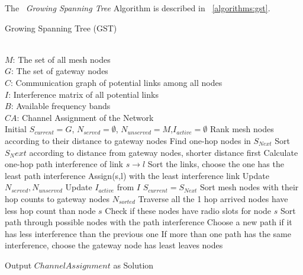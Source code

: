 The ~\emph{Growing Spanning Tree} Algorithm is described in ~\ref{algorithms:gst}.







\begin{algorithm}
    \small
\caption{Growing Spanning Tree (GST)}
\label{algorithms:gst}
\begin{algorithmic}[1]
\REQUIRE  ~~\\
	 $M$: The set of all mesh nodes\\
	 $G$: The set of gateway nodes\\
	 $C$: Communication graph of potential links among all nodes\\
	 $I$: Interference matrix of all potential links \\
	 $B$: Available frequency bands
\ENSURE ~~\\    
$CA$: Channel Assignment of the Network\\
\STATE Initial $S_{current}=G$, $N_{served}=\emptyset$, $N_{unserved}=M$,$I_{active}=\emptyset$
\STATE Rank mesh nodes according to their distance to gateway nodes
	\STATE Find one-hop nodes in $S_{Next}$
	\STATE Sort $S_Next$ according to distance from gateway nodes, shorter distance first
		\STATE Calculate one-hop path interference of link $s\rightarrow l$
		\STATE Sort the links, choose the one has the least path interference
		\STATE Assign(s,l) with the least interference link
		\STATE Update $N_{served},N_{unserved}$
		\STATE Update $I_{active}$ from $I$
	\ENDFOR
	\STATE $S_{current}=S_{Next}$
\ENDFOR
\ENDWHILE
\STATE Sort mesh nodes with their hop counts to gateway nodes $N_{sorted}$
	\STATE Traverse all the 1 hop arrived nodes have less hop count than node $s$ 
	\STATE Check if these nodes have radio slots for node $s$
	\STATE Sort path through possible nodes with the path interference
	\STATE Choose a new path if it has less interference than the previous one
	\STATE If more than one path has the same interference, choose the gateway node has least leaves nodes 
\ENDFOR
\ENDWHILE

Output $Channel Assignment$ as Solution
\end{algorithmic}
\end{algorithm}
      


